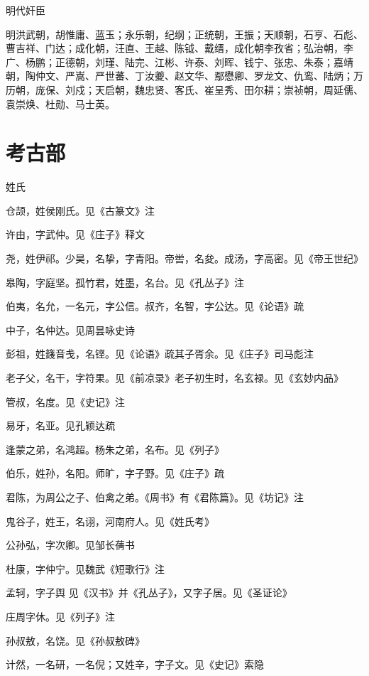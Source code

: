 \documentclass[a4paper,12pt,UTF8,twoside]{ctexbook}
\begin{document}
    明代奸臣
    
    明洪武朝，胡惟庸、蓝玉；永乐朝，纪纲；正统朝，王振；天顺朝，石亨、石彪、曹吉祥、门达；成化朝，汪直、王越、陈钺、戴缙，成化朝李孜省；弘治朝，李广、杨鹏；正德朝，刘瑾、陆完、江彬、许泰、刘晖、钱宁、张忠、朱泰；嘉靖朝，陶仲文、严嵩、严世蕃、丁汝夔、赵文华、鄢懋卿、罗龙文、仇鸾、陆炳；万历朝，庞保、刘戍；天启朝，魏忠贤、客氏、崔呈秀、田尔耕；崇祯朝，周延儒、袁崇焕、杜勋、马士英。
    
 
    
    \part{考古部}
    
    姓氏
    
    仓颉，姓侯刚氏。见《古篆文》注
    
    许由，字武仲。见《庄子》释文
    
    尧，姓伊祁。少昊，名挚，字青阳。帝喾，名夋。成汤，字高密。见《帝王世纪》
    
    皋陶，字庭坚。孤竹君，姓墨，名台。见《孔丛子》注
    
    伯夷，名允，一名元，字公信。叔齐，名智，字公达。见《论语》疏
    
    中子，名仲达。见周昙咏史诗
    
    彭祖，姓籛音戋，名铿。见《论语》疏其子胥余。见《庄子》司马彪注
    
    老子父，名干，字符果。见《前凉录》老子初生时，名玄禄。见《玄妙内品》
    
    管叔，名度。见《史记》注
    
    易牙，名亚。见孔颖达疏
    
    逢蒙之弟，名鸿超。杨朱之弟，名布。见《列子》
    
    伯乐，姓孙，名阳。师旷，字子野。见《庄子》疏
    
    君陈，为周公之子、伯禽之弟。《周书》有《君陈篇》。见《坊记》注
    
    鬼谷子，姓王，名诩，河南府人。见《姓氏考》
    
    公孙弘，字次卿。见邹长蒨书
    
    杜康，字仲宁。见魏武《短歌行》注
    
    孟轲，字子舆 见《汉书》并《孔丛子》，又字子居。见《圣证论》
    
    庄周字休。见《列子》注
    
    孙叔敖，名饶。见《孙叔敖碑》
    
    计然，一名研，一名倪；又姓辛，字子文。见《史记》索隐
    
\end{document}
